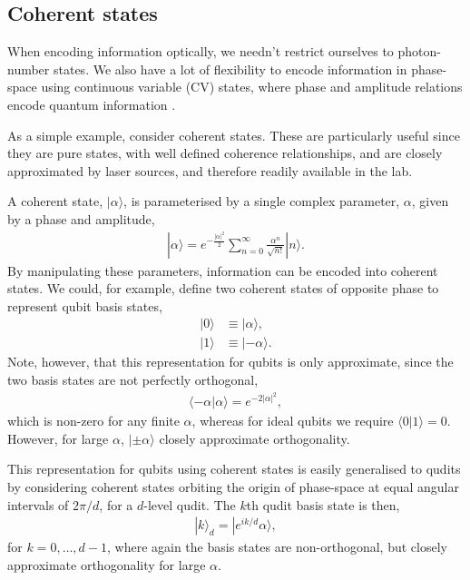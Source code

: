 \documentclass[aps,rmp,twocolumn,amsmath,amssymb,nofootinbib,superscriptaddress,longbibliography,floatfix,table-of-contents,eqsecnum]{revtex4-1}
\newcommand{\ket}[1]{|#1\rangle}
\begin{document}
%
%

\subsection{Coherent states} \label{sec:coherent_state_enc} 

When encoding information optically, we needn't restrict ourselves to photon-number states. We also have a lot of flexibility to encode information in phase-space using continuous variable (CV) states, where phase and amplitude relations encode quantum information \cite{bib:CahillGlauber69}.

As a simple example, consider coherent states. These are particularly useful since they are pure states, with well defined coherence relationships, and are closely approximated by laser sources, and therefore readily available in the lab.

A coherent state, $\ket\alpha$, is parameterised by a single complex parameter, $\alpha$, given by a phase and amplitude,
\begin{align}
\ket{\alpha} = e^{-\frac{|\alpha|^2}{2}} \sum_{n=0}^\infty \frac{\alpha^n}{\sqrt{n!}} \ket{n}.
\end{align}
By manipulating these parameters, information can be encoded into coherent states. We could, for example, define two coherent states of opposite phase to represent qubit basis states,
\begin{align}
\ket{0} &\equiv \ket{\alpha}, \nonumber \\
\ket{1} &\equiv \ket{-\alpha}.
\end{align}
Note, however, that this representation for qubits is only approximate, since the two basis states are not perfectly orthogonal,
\begin{align}
\langle -\alpha|\alpha \rangle = e^{-2|\alpha|^2},
\end{align}
which is non-zero for any finite $\alpha$, whereas for ideal qubits we require \mbox{$\langle 0|1\rangle = 0$}. However, for large $\alpha$, $\ket{\pm\alpha}$ closely approximate orthogonality.

This representation for qubits using coherent states is easily generalised to qudits by considering coherent states orbiting the origin of phase-space at equal angular intervals of \mbox{$2\pi/d$}, for a $d$-level qudit. The $k$th qudit basis state is then,
\begin{align}
\ket{k}_d = \ket{e^{ik/d}\alpha},
\end{align}
for \mbox{$k=0,\dots,d-1$}, where again the basis states are non-orthogonal, but closely approximate orthogonality for large $\alpha$.
\end{document}
